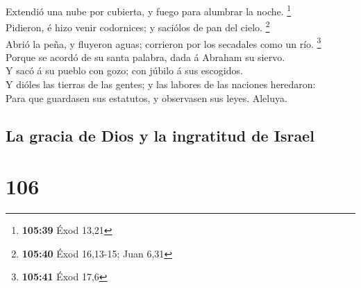  Extendió una nube por cubierta, y fuego para alumbrar la
noche. \footnote{\textbf{105:39} Éxod 13,21}\\
 Pidieron, é hizo venir codornices; y saciólos de pan del
cielo. \footnote{\textbf{105:40} Éxod 16,13-15; Juan 6,31}\\
 Abrió la peña, y fluyeron aguas; corrieron por los
secadales como un río. \footnote{\textbf{105:41} Éxod 17,6}\\
 Porque se acordó de su santa palabra, dada á Abraham su
siervo.\\
 Y sacó á su pueblo con gozo; con júbilo á sus escogidos.\\
 Y dióles las tierras de las gentes; y las labores de las
naciones heredaron:\\
 Para que guardasen sus estatutos, y observasen sus leyes.
Aleluya.

\hypertarget{la-gracia-de-dios-y-la-ingratitud-de-israel}{%
\subsection{La gracia de Dios y la ingratitud de
Israel}\label{la-gracia-de-dios-y-la-ingratitud-de-israel}}

\hypertarget{section-105}{%
\section{106}\label{section-105}}

